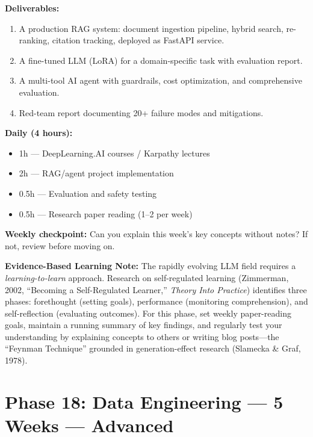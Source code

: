 \documentclass[11pt, a4paper, oneside]{report}
\begin{document}
\begin{milestonebox}
\textbf{Deliverables:}
\begin{enumerate}[leftmargin=*]
\item A production RAG system: document ingestion pipeline, hybrid search, re-ranking, citation tracking, deployed as FastAPI service.
\item A fine-tuned LLM (LoRA) for a domain-specific task with evaluation report.
\item A multi-tool AI agent with guardrails, cost optimization, and comprehensive evaluation.
\item Red-team report documenting 20+ failure modes and mitigations.
\end{enumerate}
\end{milestonebox}

\begin{practicebox}
\textbf{Daily (4 hours):}
\begin{itemize}[leftmargin=*]
\item 1h --- DeepLearning.AI courses / Karpathy lectures
\item 2h --- RAG/agent project implementation
\item 0.5h --- Evaluation and safety testing
\item 0.5h --- Research paper reading (1--2 per week)
\end{itemize}


\textbf{Weekly checkpoint:} Can you explain this week's key concepts without notes? If not, review before moving on.

\textbf{Evidence-Based Learning Note:} The rapidly evolving LLM field requires a \emph{learning-to-learn} approach. Research on self-regulated learning (Zimmerman, 2002, ``Becoming a Self-Regulated Learner,'' \emph{Theory Into Practice}) identifies three phases: forethought (setting goals), performance (monitoring comprehension), and self-reflection (evaluating outcomes). For this phase, set weekly paper-reading goals, maintain a running summary of key findings, and regularly test your understanding by explaining concepts to others or writing blog posts---the ``Feynman Technique'' grounded in generation-effect research (Slamecka \& Graf, 1978).

\end{practicebox}


\clearpage
\section[Phase 18: Data Engineering]{Phase 18: Data Engineering --- 5 Weeks --- Advanced}
\end{document}
